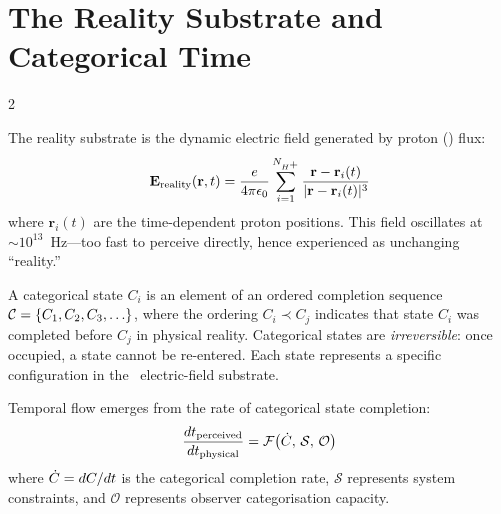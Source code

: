 \section{The Reality Substrate and Categorical Time}
\label{sec:cc_substrate}

\begin{multicols}{2}

\begin{definition}
\label{def:reality_substrate}
The reality substrate is the dynamic electric field generated by proton
(\Hplus) flux:
\begin{equation}
\mathbf{E}_{\text{reality}}(\mathbf{r},t)
  = \frac{e}{4\pi\epsilon_0}
    \sum_{i=1}^{N_{H\textsuperscript{+}}}
    \frac{\mathbf{r}-\mathbf{r}_i(t)}{|\mathbf{r}-\mathbf{r}_i(t)|^3}
\label{eq:reality_field}
\end{equation}
where $\mathbf{r}_i(t)$ are the time-dependent proton positions.  This field
oscillates at ${\sim}10^{13}$~Hz---too fast to perceive directly, hence
experienced as unchanging ``reality.''
\end{definition}

\begin{definition}
\label{def:categorical_state}
A categorical state $C_i$ is an element of an ordered completion sequence
$\mathcal{C} = \{C_1, C_2, C_3,\ldots\}$, where the ordering $C_i \prec C_j$
indicates that state $C_i$ was completed before $C_j$ in physical reality.
Categorical states are \emph{irreversible}: once occupied, a state cannot be
re-entered.  Each state represents a specific configuration in the \Hplus\
electric-field substrate.
\end{definition}

\begin{theorem}
\label{thm:time_categorical}
Temporal flow emerges from the rate of categorical state completion:
\begin{equation}
\frac{dt_{\text{perceived}}}{dt_{\text{physical}}}
  = \mathcal{F}\!\left(\dot{C},\,\mathcal{S},\,\mathcal{O}\right)
\label{eq:temporal_construction}
\end{equation}
where $\dot{C} = dC/dt$ is the categorical completion rate, $\mathcal{S}$
represents system constraints, and $\mathcal{O}$ represents observer
categorisation capacity.
\end{theorem}


\end{multicols}
